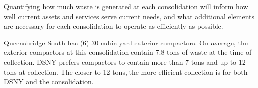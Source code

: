
    Quantifying how much waste is generated at each consolidation will inform how well current assets and services serve current needs, and what additional elements are necessary for each consolidation to operate as efficiently as possible.
    
    Queensbridge South has (6) 30-cubic yard exterior compactors. On average, the exterior compactors at this consolidation contain 7.8 tons of waste at the time of collection. DSNY prefers compactors to contain more than 7 tons and up to 12 tons at collection. The closer to 12 tons, the more efficient collection is for both DSNY and the consolidation.